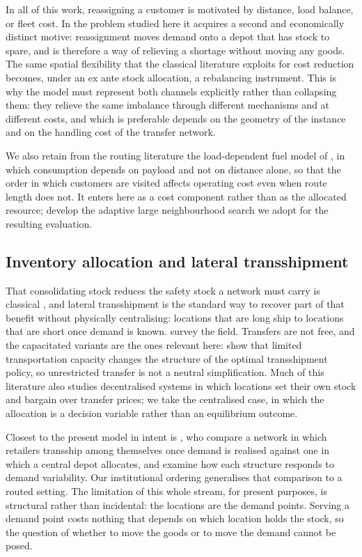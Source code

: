 \documentclass[authoryear,final,3p,times]{elsarticle}
\theoremstyle{definition}
\theoremstyle{plain}
\begin{document}
In all of this work, reassigning a customer is motivated by distance, load
balance, or fleet cost. In the problem studied here it acquires a second and
economically distinct motive: reassignment moves demand onto a depot that has
stock to spare, and is therefore a way of relieving a shortage without moving
any goods. The same spatial flexibility that the classical literature exploits
for cost reduction becomes, under an ex ante stock allocation, a rebalancing
instrument. This is why the model must represent both channels explicitly
rather than collapsing them: they relieve the same imbalance through different
mechanisms and at different costs, and which is preferable depends on the
geometry of the instance and on the handling cost of the transfer network.

We also retain from the routing literature the load-dependent fuel model of
\citet{bektas2011pollution}, in which consumption depends on payload and not on
distance alone, so that the order in which customers are visited affects
operating cost even when route length does not. It enters here as a cost
component rather than as the allocated resource; \citet{demir2012alns} develop
the adaptive large neighbourhood search we adopt for the resulting evaluation.

\subsection{Inventory allocation and lateral transshipment}
\label{subsec:inventory_transshipment}

That consolidating stock reduces the safety stock a network must carry is
classical \citep{eppen1979centralization}, and lateral transshipment is the
standard way to recover part of that benefit without physically centralising:
locations that are long ship to locations that are short once demand is known.
\citet{paterson2011lateral} survey the field. Transfers are not free, and the
capacitated variants are the ones relevant here: \citet{ozdemir2006capacitated}
show that limited transportation capacity changes the structure of the optimal
transshipment policy, so unrestricted transfer is not a neutral simplification.
Much of this literature also studies decentralised systems in which locations
set their own stock and bargain over transfer prices; we take the centralised
case, in which the allocation is a decision variable rather than an equilibrium
outcome.

Closest to the present model in intent is \citet{rosales2013retailer}, who
compare a network in which retailers transship among themselves once demand is
realised against one in which a central depot allocates, and examine how each
structure responds to demand variability. Our institutional ordering
generalises that comparison to a routed setting. The limitation of this whole
stream, for present purposes, is structural rather than incidental: the
locations are the demand points. Serving a demand point costs nothing that
depends on which location holds the stock, so the question of whether to move
the goods or to move the demand cannot be posed.
\end{document}
